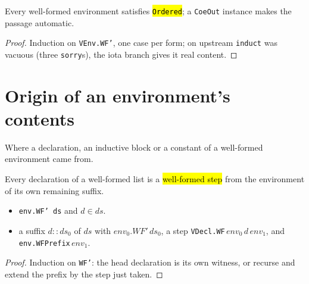 \begin{theorem}
\label{thm:wf-ordered}
\leanok
{}

 Every well-formed environment satisfies \hl{\texttt{Ordered}}; a
\texttt{CoeOut} instance makes the passage automatic.
\end{theorem}
\begin{proof}
\leanok
{} Induction on \texttt{VEnv.WF'}, one case per form; on upstream \texttt{induct} was
vacuous (three \texttt{sorry}s), the iota branch gives it real content.
\end{proof}

\section{Origin of an environment's contents}

Where a declaration, an inductive block or a constant of a well-formed environment came from.

\begin{lemma}
\label{thm:wf-step-of-mem}
\leanok
{}

 Every declaration of a well-formed list is a \hl{well-formed step} from the
environment of its own remaining suffix.
\begin{itemize}
\item {} \texttt{env.WF' ds} and $d \in ds$.
\item {} a suffix $d :: ds_0$ of $ds$ with $env_0.WF'\,ds_0$, a step
  \texttt{VDecl.WF}\,$env_0\,d\,env_1$, and \texttt{env.WFPrefix}\,$env_1$.
\end{itemize}
\end{lemma}
\begin{proof}
\leanok
{} Induction on \texttt{WF'}: the head declaration is its own witness, or recurse and
extend the prefix by the step just taken.
\end{proof}

